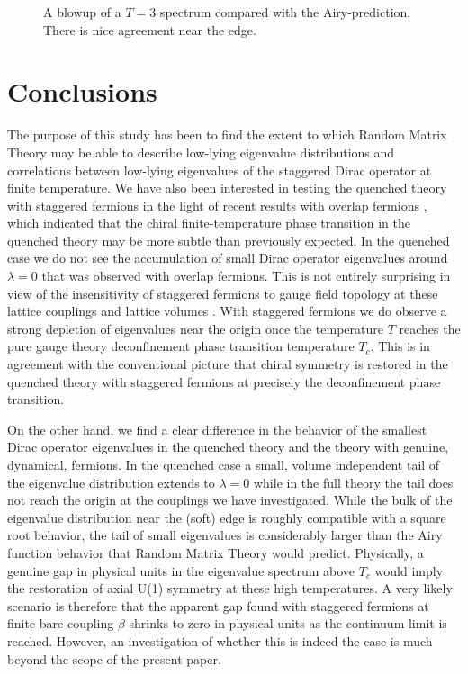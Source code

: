 \documentclass[11pt]{article}
\newcommand{\noi}{\vspace{12pt}\noindent}
\begin{document}
\begin{figure}
\begin{center}
\textwidth
{}
\end{center}
\vspace*{-2mm}
\caption{A blowup of a $T=3$ spectrum compared with the Airy-prediction.
There is nice agreement near the edge.}
\label{fig:matrix_airy_compare}
\end{figure}


\section {Conclusions}

The purpose of this study has been to find the extent to which Random
Matrix Theory may be able to describe low-lying eigenvalue distributions and
correlations between low-lying
eigenvalues of the staggered Dirac operator at finite
temperature. We have also been interested in testing the quenched theory
with staggered fermions in the light of recent results with overlap
fermions \cite{EHKN_fT}, which indicated that the chiral 
finite-temperature phase transition in the quenched theory may be more
subtle than previously expected. In the quenched case we do not see the
accumulation of small Dirac operator eigenvalues around $\lambda=0$ that
was observed with overlap fermions. This is not entirely surprising in
view of the insensitivity of staggered fermions to gauge field topology
at these lattice couplings and lattice volumes \cite{DHNR,FHL}. With 
staggered fermions we do observe a strong depletion of eigenvalues
near the origin once the temperature $T$ reaches the pure gauge theory
deconfinement phase transition temperature $T_c$. This is in agreement with 
the conventional picture that chiral symmetry is restored in the quenched 
theory with staggered fermions at precisely the deconfinement phase
transition.

\noi
On the other hand, we find a clear difference in the behavior of the smallest
Dirac operator eigenvalues in the quenched theory and the theory with
genuine, dynamical, fermions. In the quenched case a small, volume
independent tail of the eigenvalue distribution extends to $\lambda=0$
while in the full theory the tail does not reach the origin at the couplings
we have investigated. While the
bulk of the eigenvalue distribution near the (soft) edge is roughly
compatible with a square root behavior, the tail of small eigenvalues
is considerably larger than the Airy function behavior that Random
Matrix Theory would predict.
Physically, a genuine gap in physical units in the eigenvalue spectrum 
above $T_c$ would imply the restoration of axial U(1) symmetry at these
high temperatures. A very likely scenario is therefore that the
apparent gap found with staggered fermions at finite bare coupling $\beta$
shrinks to zero in physical units as the continuum limit is reached.
However, an investigation of whether this is indeed the case
is much beyond the scope of the present paper.  
\end{document}
